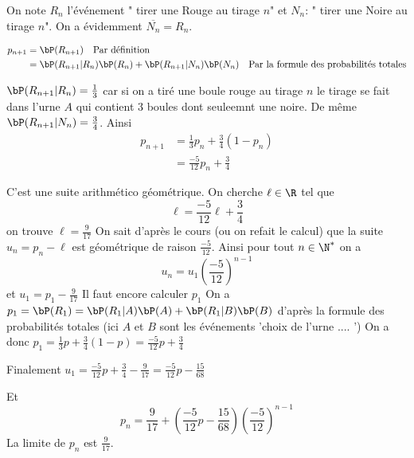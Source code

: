 \documentclass[a4paper, 11pt,reqno]{article}
\begin{document}
\begin{correction}
On note $R_n$ l'événement " tirer une Rouge au tirage $n$" et $N_n$: " tirer une Noire au tirage $n$". On a évidemment $\overline{N_n} =R_n$. 

\begin{align*}
p_{n+1} &= \bP(R_{n+1} ) \quad \text{Par définition} \\
			&= \bP(R_{n+1}  | R_n ) \bP(R_n) +   \bP(R_{n+1}  | N_n ) \bP(N_n)  \quad \text{Par la formule des probabilités totales} 
\end{align*}

$\bP(R_{n+1}  | R_n ) =\frac{1}{3}$  car si on a tiré une boule rouge au tirage $n$ le tirage se fait dans l'urne $A$ qui contient 3 boules dont seuleemnt une noire. De même $\bP(R_{n+1}  | N_n ) =\frac{3}{4}$.
Ainsi
\begin{align*}
p_{n+1} &= \frac{1}{3}p_n + \frac{3}{4}(1-p_n)\\
			&= \frac{-5}{12} p_n + \frac{3}{4}
\end{align*}

C'est une suite arithmético géométrique. On cherche $\ell\in \R$ tel que 
$$\ell =  \frac{-5}{12} \ell+ \frac{3}{4}$$
on trouve $\ell = \frac{9}{17}$
On sait d'après le cours (ou  on refait le calcul) que la suite $u_n=p_n - \ell  $ est géométrique de raison $\frac{-5}{12}$. 
Ainsi pour tout $n\in \N^*$ on a 
$$u_n = u_1 \left(\frac{-5}{12} \right)^{n-1}$$
et $u_1 = p_1- \frac{9}{17} $
Il faut encore calculer $p_1$ 
On a $p_1= \bP(R_1) = \bP(R_1|A) \bP(A) +  \bP(R_1|B) \bP(B)$ d'après la formule des probabilités totales (ici $A$ et $B$ sont les événements 'choix de l'urne .... ') 
On a donc $p_1 = \frac{1}{3}p +\frac{3}{4}(1-p)= \frac{-5}{12} p + \frac{3}{4}$

Finalement $u_1= \frac{-5}{12} p + \frac{3}{4} - \frac{9}{17}=  \frac{-5}{12} p-\frac{15}{68}$

Et $$p_n = \frac{9}{17}  + \left(\frac{-5}{12} p-\frac{15}{68}\right) \left(\frac{-5}{12} \right)^{n-1}$$
La limite de $p_n$ est $\frac{9}{17}$.

\end{correction}
\end{document}
